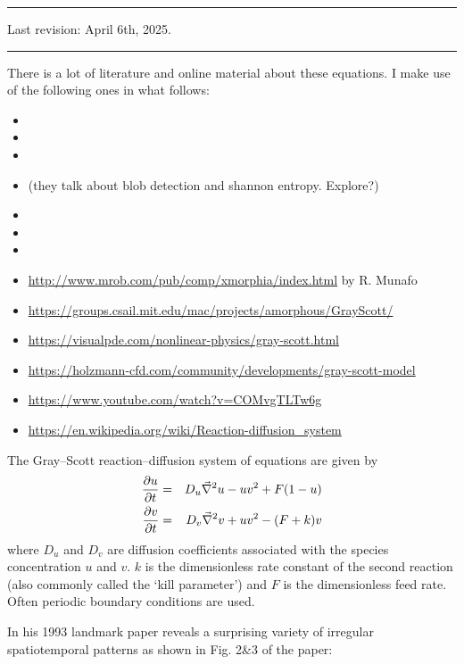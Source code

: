 \par\noindent\rule{\textwidth}{0.4pt}

Last revision: April 6th, 2025.

\par\noindent\rule{\textwidth}{0.4pt}


There is a lot of literature and online material about these equations. I make use of the following 
ones in what follows:
\begin{itemize}
\item {}
\item {}
\item {}
\item {} (they talk about blob detection and shannon entropy. Explore?)
\item {}
\item {}
\item {}
\item \url{http://www.mrob.com/pub/comp/xmorphia/index.html} by R. Munafo
\item \url{https://groups.csail.mit.edu/mac/projects/amorphous/GrayScott/}
\item \url{https://visualpde.com/nonlinear-physics/gray-scott.html}
\item \url{https://holzmann-cfd.com/community/developments/gray-scott-model}
\item \url{https://www.youtube.com/watch?v=COMvgTLTw6g}
\item \url{https://en.wikipedia.org/wiki/Reaction-diffusion_system}
\end{itemize}

The Gray–Scott reaction–diffusion system of equations are given by
\begin{eqnarray}
\frac{\partial u}{\partial t} &=& D_u \vec\nabla^2 u - uv^2 + F(1-u) \nonumber\\
\frac{\partial v}{\partial t} &=& D_v \vec\nabla^2 v + uv^2 - (F+k)v
\end{eqnarray}
where $D_u$ and $D_v$ are diffusion coefficients associated with the species concentration $u$
and $v$. $k$ is the dimensionless rate constant of the second reaction (also commonly called the `kill 
parameter') and $F$ is the dimensionless feed rate.
Often periodic boundary conditions are used. 

In his 1993 landmark paper \textcite{pear93} reveals a surprising variety of 
irregular spatiotemporal patterns as shown in Fig. 2\&3 of the paper:

